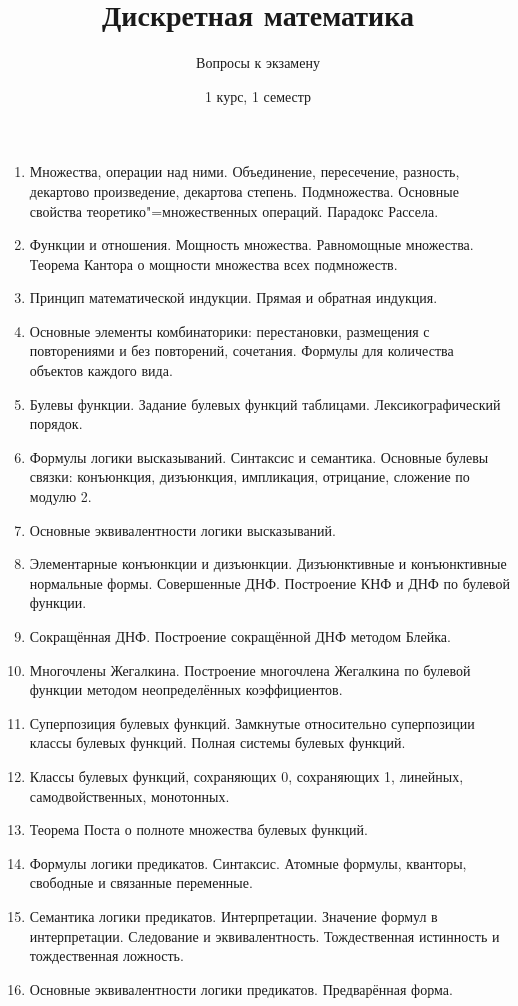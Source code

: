 \documentclass[12pt,a4paper]{article}
\begin{document}
\title{Дискретная математика}
\author{Вопросы к экзамену}
\date{1 курс, 1 семестр}
\maketitle
\thispagestyle{empty}

\begin{enumerate}

\item
Множества, операции над ними. Объединение, пересечение, разность, декартово произведение, декартова степень.
Подмножества.
Основные свойства теоретико"=множественных операций.
Парадокс Рассела.
\item
Функции и отношения. Мощность множества. Равномощные множества.
Теорема Кантора о мощности множества всех подмножеств.
\item
Принцип математической индукции. Прямая и обратная индукция.
\item
Основные элементы комбинаторики: перестановки,
размещения с повторениями и без повторений, сочетания.
Формулы для количества объектов каждого вида.
\item
Булевы функции. Задание булевых функций таблицами. Лексикографический порядок.
\item
Формулы логики высказываний. Синтаксис и семантика.
Основные булевы связки: конъюнкция, дизъюнкция, импликация, отрицание, сложение по модулю 2.
\item
Основные эквивалентности логики высказываний.
\item
Элементарные конъюнкции и дизъюнкции.
Дизъюнктивные и конъюнктивные нормальные формы. Совершенные ДНФ.
Построение КНФ и ДНФ по булевой функции.
\item
Сокращённая ДНФ. Построение сокращённой ДНФ методом Блейка.
\item
Многочлены Жегалкина.
Построение многочлена Жегалкина по булевой функции методом неопределённых коэффициентов.
\item
Суперпозиция булевых функций. Замкнутые относительно
суперпозиции классы булевых функций. Полная системы булевых функций.
\item
Классы булевых функций, сохраняющих 0, сохраняющих 1, линейных, самодвойственных, монотонных.
\item
Теорема Поста о полноте множества булевых функций.
\item
Формулы логики предикатов. Синтаксис.
Атомные формулы, кванторы, свободные и связанные переменные.
\item
Семантика логики предикатов. Интерпретации.
Значение формул в интерпретации. Следование и эквивалентность.
Тождественная истинность и тождественная ложность.
\item
Основные эквивалентности логики предикатов. Предварённая форма.
\end{enumerate}
\end{document}
